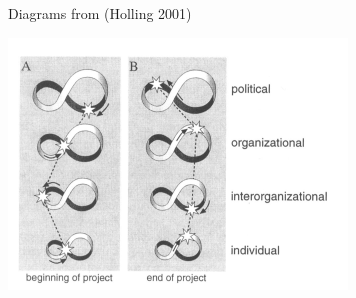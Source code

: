 \documentclass{beamer}
\begin{document}
\begin{frame}{Diagrams from (Holling 2001)}
  \begin{center}
    \includegraphics[width=.85\textwidth]{Holling-5.png}
  \end{center}
\end{frame}
\end{document}
